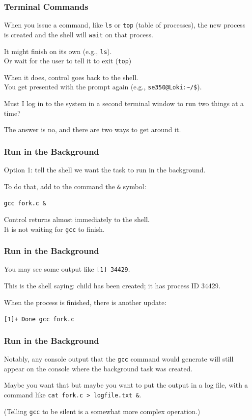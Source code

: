 \begin{frame}
	\frametitle{Terminal Commands}

	When you issue a command, like \texttt{ls} or \texttt{top} (table of processes), the new process is created and the shell will \texttt{wait} on that process.

	It might finish on its own (e.g., \texttt{ls}).\\
	\quad Or wait for the user to tell it to exit (\texttt{top})

	When it does, control goes back to the shell.\\
	\quad You get presented with the prompt again (e.g., \texttt{se350@Loki:\~{}/\$}).

	Must I log in to the system in a second terminal window to run two things at a time?

	The answer is no, and there are two ways to get around it.

\end{frame}

\begin{frame}
	\frametitle{Run in the Background}

	Option 1: tell the shell we want the task to run in the background.

	To do that, add to the command the \texttt{\&} symbol:

	\texttt{gcc fork.c \&}

	Control returns almost immediately to the shell.\\
	\quad It is not waiting for \texttt{gcc} to finish.

\end{frame}

\begin{frame}
	\frametitle{Run in the Background}

	You may see some output like \texttt{[1] 34429}.

	This is the shell saying: child has been created; it has process ID 34429.

	When the process is finished, there is another update:

	\texttt{[1]+  Done                    gcc fork.c}

\end{frame}

\begin{frame}
	\frametitle{Run in the Background}

	Notably, any console output that the \texttt{gcc} command would generate will still appear on the console where the background task was created.

	Maybe you want that but maybe you want to put the output in a log file, with a command like \texttt{cat fork.c > logfile.txt \&}.

	(Telling \texttt{gcc} to be silent is a somewhat more complex operation.)

\end{frame}


